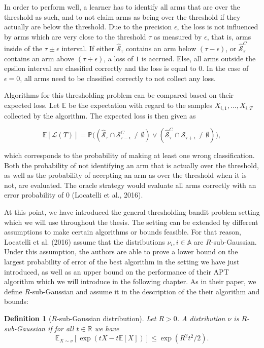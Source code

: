 \documentclass[11pt,]{article}
\newtheorem{definition}{Definition}
\begin{document}
In order to perform well, a learner has to identify all arms that are
over the threshold as such, and to not claim arms as being over the
threshold if they actually are below the threshold. Due to the precision
\(\epsilon\), the loss is not influenced by arms which are very close to
the threshold \(\tau\) as measured by \(\epsilon\), that is, arms inside
of the \(\tau \pm \epsilon\) interval. If either
\(\hat{\mathcal{S}}_{\tau}\) contains an arm below
\((\tau - \epsilon)\), or \(\hat{\mathcal{S}}^C_{\tau}\) contains an arm
above \((\tau + \epsilon)\), a loss of \(1\) is accrued. Else, all arms
outside the epsilon interval are classified correctly and the loss is
equal to \(0\). In the case of \(\epsilon = 0\), all arms need to be
classified correctly to not collect any loss.

Algorithms for this thresholding problem can be compared based on their
expected loss. Let \(\mathbb{E}\) be the expectation with regard to the
samples \(X_{i,1}, ..., X_{i,T}\) collected by the algorithm. The
expected loss is then given as

\[
\mathbb{E}[\mathcal{L}(T)] = \mathbb{P}\big((\hat{\mathcal{S}}_{\tau} \cap \mathcal{S}_{\tau-\epsilon}^C \neq \emptyset) \lor(\hat{\mathcal{S}}_{\tau}^C \cap \mathcal{S}_{\tau+\epsilon} \neq \emptyset)\big),
\]

which corresponds to the probability of making at least one wrong
classification. Both the probability of not identifying an arm that is
actually over the threshold, as well as the probability of accepting an
arm as over the threshold when it is not, are evaluated. The oracle
strategy would evaluate all arms correctly with an error probability of
\(0\) (Locatelli et al., 2016).

At this point, we have introduced the general thresholding bandit
problem setting which we will use throughout the thesis. The setting can
be extended by different assumptions to make certain algorithms or
bounds feasible. For that reason, Locatelli et al. (2016) assume that
the distributions \(\nu_i, i \in \mathbb{A}\) are \(R\)-sub-Gaussian.
Under this assumption, the authors are able to prove a lower bound on
the largest probability of error of the best algorithm in the setting we
have just introduced, as well as an upper bound on the performance of
their APT algorithm which we will introduce in the following chapter. As
in their paper, we define \(R\)-sub-Gaussian and assume it in the
description of the their algorithm and bounds:

\begin{definition}[$R$-sub-Gaussian distribution] 
\label{definition:rsubgaussian}
Let $R > 0$. A distribution $\nu$ is $R$-sub-Gaussian if for all $t \in \mathbb{R}$ we have
\begin{equation*}
\mathbb{E}_{X \sim \nu}[\exp(tX - t\mathbb{E}[X])] \leq \exp(R^2t^2/2).
\end{equation*}
\end{definition}
\end{document}
